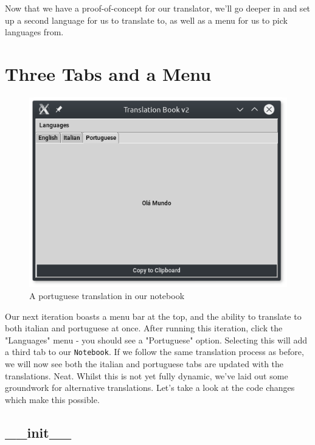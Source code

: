 \documentclass[a4paper,11pt,openany]{book}
\begin{document}
Now that we have a proof-of-concept for our translator, we'll go deeper in and set up a second language for us to translate to, as well as a menu for us to pick languages from. 

\newpage

\section{Three Tabs and a Menu}

\begin{figure}[h]
\centering
\includegraphics{Ch3-2}
\caption{A portuguese translation in our notebook}
\end{figure}

Our next iteration boasts a menu bar at the top, and the ability to translate to both italian and portuguese at once. After running this iteration, click the "Languages" menu - you should see a "Portuguese" option. Selecting this will add a third tab to our \lstinline[columns=fixed]{Notebook}. If we follow the same translation process as before, we will now see both the italian and portuguese tabs are updated with the translations. Neat. Whilst this is not yet fully dynamic, we've laid out some groundwork for alternative translations. Let's take a look at the code changes which make this possible.

\newpage 



\subsection{\_\_init\_\_}
\end{document}
